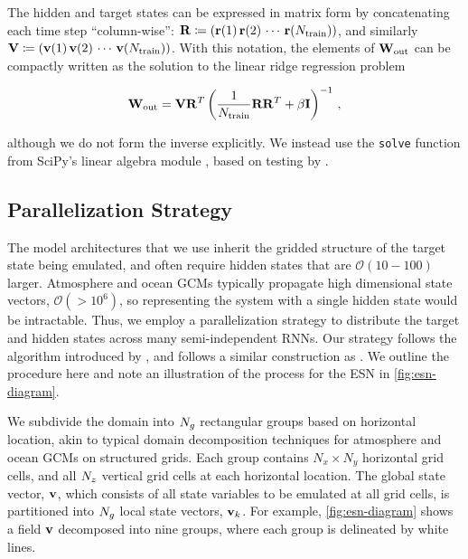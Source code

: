 The hidden and target states can be expressed in matrix form by concatenating
each time step ``column-wise'':
$\mathbf{R} \coloneqq (\mathbf{r}(1) \, \mathbf{r}(2) \, \cdots \, \mathbf{r}(N_\text{train}))$,
and similarly\\
\noindent$\mathbf{V} \coloneqq (\mathbf{v}(1) \, \mathbf{v}(2) \, \cdots \, \mathbf{v}(N_\text{train}))$.
With this notation, the elements of $\mathbf{W}_\text{out}$ can be compactly written as the
solution to the linear ridge regression problem
\begin{linenomath*}\begin{equation}
    \mathbf{W}_\text{out} = \mathbf{V} \mathbf{R}^T \left(\dfrac{1}{N_\text{train}}\mathbf{R}\mathbf{R}^T +
    \beta\mathbf{I}\right)^{-1} \, ,
    \label{eq:ridge_regression}
\end{equation}\end{linenomath*}
although we do not form the inverse explicitly.
We instead use the \texttt{solve} function from SciPy's linear algebra module
\citep{scipy_2020}, based on testing by
\citet{platt_systematic_2022}.


\subsection{Parallelization Strategy}
\label{subsec:parallelization}

The model architectures that we use inherit the gridded structure of the target
state being emulated, and often require hidden states that are
$\mathcal{O}(10-100)$ larger.
Atmosphere and ocean GCMs typically propagate high dimensional state vectors,
$\mathcal{O}(>10^6)$,
so representing the system with a single hidden state would be intractable.
Thus, we employ a parallelization strategy to distribute the target and hidden
states across many semi-independent RNNs.
Our strategy follows the algorithm introduced by \citet{pathak_model-free_2018},
and follows a similar construction as \citet{arcomano_machine_2020}.
We outline the procedure here and note an illustration of the process for
the ESN in \cref{fig:esn-diagram}.

We subdivide the domain into $N_{g}$ rectangular groups based on horizontal location,
akin to typical domain decomposition techniques for atmosphere and ocean
GCMs on structured grids.
Each group contains
$N_x\times N_y$ horizontal grid cells, and all $N_{z}$
vertical grid cells at each horizontal location.
The global state vector, $\mathbf{v}$, which consists of all state variables to be
emulated at all grid cells, is partitioned into $N_{g}$ local state vectors,
$\mathbf{v}_{k}$.
For example, \cref{fig:esn-diagram} shows a field $\mathbf{v}$ decomposed into nine
groups, where each group is delineated by white lines.

